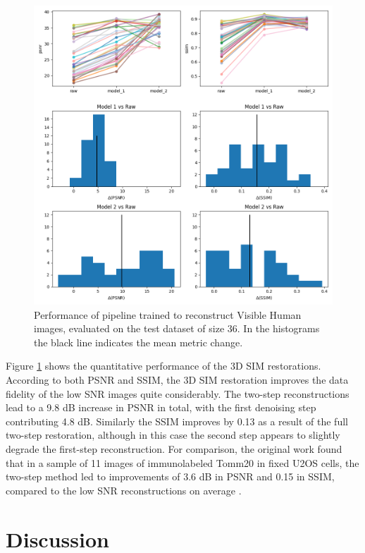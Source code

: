 \documentclass[12pt]{article}
\begin{document}
\begin{figure}[hbtp]
    \includegraphics[scale=0.55, center]{figures/m021_m022_pipeline_stats.png}
    \caption{Performance of pipeline trained to reconstruct Visible Human images, evaluated on the test dataset of size 36.
    In the histograms the black line indicates the mean metric change.}
    \label{fig:vh_stats}
\end{figure}

Figure \ref{fig:vh_stats} shows the quantitative performance of the 3D SIM restorations.
According to both PSNR and SSIM, the 3D SIM restoration improves the data fidelity of the low SNR images quite considerably.
The two-step reconstructions lead to a 9.8 dB increase in PSNR in total,
with the first denoising step contributing 4.8 dB.
Similarly the SSIM improves by 0.13 as a result of the full two-step restoration,
although in this case the second step appears to slightly degrade the first-step reconstruction.
For comparison, the original work found that in a sample of 11 images of immunolabeled Tomm20 in fixed U2OS cells,
the two-step method led to improvements of 3.6 dB in PSNR and 0.15 in SSIM, compared to the low SNR reconstructions on average \cite{keypaper}.

\section{Discussion}
\end{document}
